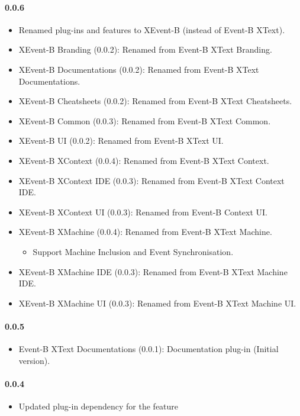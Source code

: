 \paragraph{0.0.6}
\begin{itemize}
\item Renamed plug-ins and features to XEvent-B (instead of Event-B XText).
\item XEvent-B Branding (0.0.2): Renamed from Event-B XText Branding.
\item XEvent-B Documentations (0.0.2): Renamed from Event-B XText Documentations.
\item XEvent-B Cheatsheets (0.0.2): Renamed from Event-B XText Cheatsheets.
\item XEvent-B Common (0.0.3): Renamed from Event-B XText Common.
\item XEvent-B UI (0.0.2): Renamed from Event-B XText UI.
\item XEvent-B XContext (0.0.4): Renamed from Event-B XText Context.
\item XEvent-B XContext IDE (0.0.3): Renamed from Event-B XText Context IDE.
\item XEvent-B XContext UI (0.0.3): Renamed from Event-B Context UI.
\item XEvent-B XMachine (0.0.4): Renamed from Event-B XText Machine.
	\begin{itemize}
		\item Support Machine Inclusion and Event Synchronisation.
	\end{itemize}	
\item XEvent-B XMachine IDE (0.0.3): Renamed from Event-B XText Machine IDE.
\item XEvent-B XMachine UI (0.0.3): Renamed from Event-B XText Machine UI.
\end{itemize}

\paragraph{0.0.5}
\begin{itemize}
\item Event-B XText Documentations (0.0.1): Documentation plug-in (Initial version).
\end{itemize}

\paragraph{0.0.4}
\begin{itemize}
\item Updated plug-in dependency for the feature
\end{itemize}

